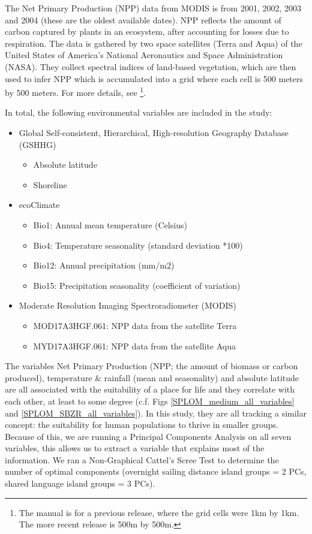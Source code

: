 \documentclass[unnumsec,webpdf,modern,medium]{oup-authoring-template}
\begin{document}
\begin{appendices}
The Net Primary Production (NPP) data from MODIS is from 2001, 2002, 2003 and 2004 (these are the oldest available dates). NPP reflects the amount of carbon captured by plants in an ecosystem, after accounting for losses due to respiration. The data is gathered by two space satellites (Terra and Aqua) of the United States of America's National Aeronautics and Space Administration (NASA). They collect spectral indices of land-based vegetation, which are then used to infer NPP which is accumulated into a grid where each cell is 500 meters by 500 meters. For more details, see \citet{running2015daily} \footnote{The manual is for a previous release, where the grid cells were 1km by 1km. The more recent release is 500m by 500m.}.

In total, the following environmental variables are included in the study:

\begin{itemize}
\item Global Self-consistent, Hierarchical, High-resolution Geography Database (GSHHG)
\begin{itemize}
    \item Absolute latitude
    \item Shoreline
\end{itemize}
\item ecoClimate
\begin{itemize}
\item Bio1: Annual mean temperature (Celsius)
\item Bio4: Temperature seasonality (standard deviation *100)
\item Bio12: Annual precipitation (mm/m2)
\item Bio15: Precipitation seasonality (coefficient of variation)
\end{itemize}
\item Moderate Resolution Imaging Spectroradiometer (MODIS)
\begin{itemize}
    \item MOD17A3HGF.061: NPP data from the satellite Terra
    \item MYD17A3HGF.061: NPP data from the satellite Aqua
\end{itemize}
\end{itemize}

The variables Net Primary Production (NPP; the amount of biomass or carbon produced), temperature \& rainfall (mean and seasonality) and absolute latitude are all associated with the suitability of a place for life and they correlate with each other, at least to some degree (c.f. Figs \ref{SPLOM_medium_all_variables} and \ref{SPLOM_SBZR_all_variables}). In this study, they are all tracking a similar concept: the suitability for human populations to thrive in smaller groups. Because of this, we are running a Principal Components Analysis on all seven variables, this allows us to extract a variable that explains most of the information. We ran a Non-Graphical Cattel's Scree Test \citep{cattell1966scree, R-nFactors} to determine the number of optimal components (overnight sailing distance island groups = 2 PCs, shared language island groups = 3 PCs).
\FloatBarrier




\end{appendices}
\end{document}
